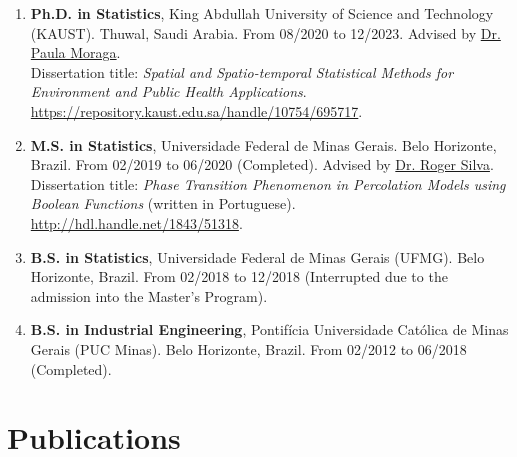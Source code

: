 \documentclass[10pt, ]{article}
\begin{document}
	\begin{enumerate}[noitemsep, topsep=0pt]
		\item \textbf{Ph.D. in Statistics}, King Abdullah University of Science and Technology (KAUST). Thuwal, Saudi Arabia. From 08/2020 to 12/2023. Advised by \href{https://www.paulamoraga.com/}{Dr. Paula Moraga}. %
		\\
		Dissertation title: \textit{Spatial and Spatio-temporal Statistical Methods for Environment and Public Health Applications}. \href{https://repository.kaust.edu.sa/handle/10754/695717}{\url{https://repository.kaust.edu.sa/handle/10754/695717}}.
		
		\item \textbf{M.S. in Statistics}, Universidade Federal de Minas Gerais. Belo Horizonte, Brazil. From 02/2019 to 06/2020 (Completed). Advised by \href{http://www.est.ufmg.br/~rogerwcs/}{Dr. Roger Silva}. %
		\\
		Dissertation title: \textit{Phase Transition Phenomenon in Percolation Models using Boolean Functions} (written in Portuguese). \href{http://hdl.handle.net/1843/51318}{\url{http://hdl.handle.net/1843/51318}}.
		
		\item \textbf{B.S. in Statistics}, Universidade Federal de Minas Gerais (UFMG). Belo Horizonte, Brazil. From 02/2018 to 12/2018 (Interrupted due to the admission into the Master's Program).
		
		\item \textbf{B.S. in Industrial Engineering}, Pontifícia Universidade Católica de Minas Gerais (PUC Minas). Belo Horizonte, Brazil. From 02/2012 to 06/2018 \hspace{-1pt}(Completed). %
		
	\end{enumerate}
	
	\vspace{10pt}
	
	\vspace{-12pt}
	\section*{Publications} \vspace{-5pt}
	
\end{document}
